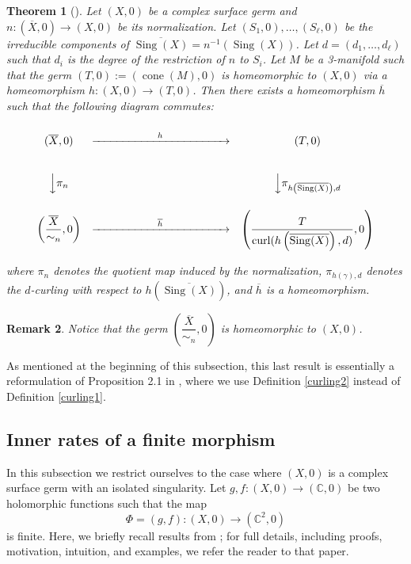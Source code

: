 \documentclass[reqno,dvipsnames,12pt]{amsart}
\newtheorem{thm}{Theorem}[section]
\newtheorem{rema}[thm]{Remark}
\begin{document}
\begin{thm}[{\cite[Proposition 2.1]{luengopichon}}]\label{luengopichon2}
Let $(X,0)$ be a complex surface germ and $n:(\overline{X},0) \longrightarrow (X,0)$ be its normalization. Let
$(S_1,0),\ldots,(S_{\ell},0)$ be the irreducible components of
$\overline{\operatorname{Sing}(X)}=n^{-1}(\operatorname{Sing}(X))$.
Let $d=(d_1,\ldots,d_{\ell})$ such that $d_i$ is the degree of the
restriction of $n$ to $S_i$. Let $M$ be a 3-manifold such that the germ
$(T,0):=(\operatorname{cone}(M),0)$ is homeomorphic to $(X,0)$ via a
homeomorphism
$h:(X,0)\longrightarrow(T,0)$. Then there exists a homeomorphism $\overline{h}$ such that the  following diagram commutes:

\[
\renewcommand{\arraystretch}{2}
\begin{array}{ccc}
(\overline{X},0) 
& \xrightarrow{\hspace{2cm} h \hspace{2cm}} &
(T,0)
\\[5mm]
\Big\downarrow{\pi_{n}}
&&
\Big\downarrow{\pi_{h\left(\overline{\operatorname{Sing}(X)}\right),d}}
\\[5mm]
\left(\dfrac{\overline{X}}{\sim_n},0\right)
& \xrightarrow{\hspace{2cm} \overline{h} \hspace{2cm}} &
\left(
\dfrac{T}{\mathrm{curl}(h\left(\overline{\operatorname{Sing}(X)} \right),d)},0
\right)
\end{array}
\]

where $\pi_n$ denotes the quotient map induced by the normalization,
$\pi_{h(\gamma),d}$ denotes the $d$-curling with respect to $h\left(\overline{\operatorname{Sing}(X)}\right)$,
and $\overline{h}$ is a homeomorphism.
\end{thm}
\begin{rema}
Notice that the germ \(\left(\dfrac{\overline{X}}{\sim_n},0\right)\) is homeomorphic to \((X,0)\).
\end{rema}
As mentioned at the beginning of this subsection, this last result is essentially a reformulation of Proposition 2.1 in \cite{luengopichon}, where we use Definition \ref{curling2} instead of Definition \ref{curling1}.
\subsection{Inner rates of a finite morphism}\label{section2}

In this subsection we restrict ourselves to the case where $(X,0)$ is a complex surface germ with an isolated singularity. Let 
$g,f : (X,0) \to (\mathbb{C},0)$ be two holomorphic functions such that the map
\[
\Phi = (g,f) : (X,0) \to (\mathbb{C}^2,0)
\]
is finite. Here, we briefly recall results from \cite{yenni1}; for full details, including proofs, motivation, intuition, and examples, we refer the reader to that paper.
\end{document}
